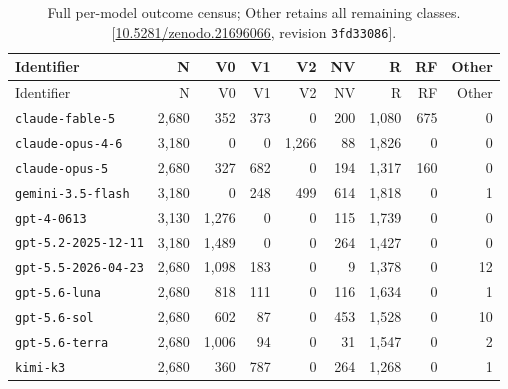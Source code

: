 \documentclass[11pt,letterpaper]{article}
\begin{document}
{\small
\begin{longtable}{lrrrrrrrr}
\caption{Full per-model outcome census; Other retains all remaining classes. [\href{https://doi.org/10.5281/zenodo.21696066}{10.5281/zenodo.21696066}, revision \texttt{3fd33086}].}\label{tab:evidence-11}\\
\toprule
Identifier & N & V0 & V1 & V2 & NV & R & RF & Other \\ \midrule
\endfirsthead
\toprule
Identifier & N & V0 & V1 & V2 & NV & R & RF & Other \\ \midrule
\endhead
\texttt{claude-fable-5} & 2,680 & 352 & 373 & 0 & 200 & 1,080 & 675 & 0 \\
\texttt{claude-opus-4-6} & 3,180 & 0 & 0 & 1,266 & 88 & 1,826 & 0 & 0 \\
\texttt{claude-opus-5} & 2,680 & 327 & 682 & 0 & 194 & 1,317 & 160 & 0 \\
\texttt{gemini-3.5-flash} & 3,180 & 0 & 248 & 499 & 614 & 1,818 & 0 & 1 \\
\texttt{gpt-4-0613} & 3,130 & 1,276 & 0 & 0 & 115 & 1,739 & 0 & 0 \\
\texttt{gpt-5.2-2025-12-11} & 3,180 & 1,489 & 0 & 0 & 264 & 1,427 & 0 & 0 \\
\texttt{gpt-5.5-2026-04-23} & 2,680 & 1,098 & 183 & 0 & 9 & 1,378 & 0 & 12 \\
\texttt{gpt-5.6-luna} & 2,680 & 818 & 111 & 0 & 116 & 1,634 & 0 & 1 \\
\texttt{gpt-5.6-sol} & 2,680 & 602 & 87 & 0 & 453 & 1,528 & 0 & 10 \\
\texttt{gpt-5.6-terra} & 2,680 & 1,006 & 94 & 0 & 31 & 1,547 & 0 & 2 \\
\texttt{kimi-k3} & 2,680 & 360 & 787 & 0 & 264 & 1,268 & 0 & 1 \\
\bottomrule\end{longtable}

}
\end{document}
